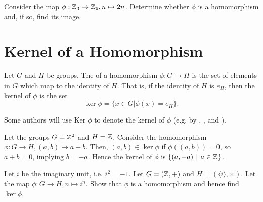 \begin{exercise}
    Consider the map $\phi: \mathbb{Z}_3 \to \mathbb{Z}_6, n \mapsto 2n$. Determine whether $\phi$ is a homomorphism and, if so, find its image.
\end{exercise}



\section{Kernel of a Homomorphism}
\begin{definition}
    Let $G$ and $H$ be groups. The  of a homomorphism $\phi: G \to H$ is the set of elements in $G$ which map to the identity of $H$. That is, if the identity of $H$ is $e_H$, then the kernel of $\phi$ is the set
    \[
        \ker\phi = \{x \in G \vert \phi(x) = e_H\}.
    \]
\end{definition}

\begin{remark}
    Some authors will use $\mathrm{Ker}\;\phi$ to denote the kernel of $\phi$ (e.g. by \cite[Definition I.2.2]{hungerford_1980}, \cite[\S 65]{clark_1984}, and \cite[p.~194]{gallian_2016}).
\end{remark}

\begin{example}
    Let the groups $G = \mathbb{Z}^2$ and $H = \mathbb{Z}$. Consider the homomorphism $\phi: G \to H, (a, b) \mapsto a+b$. Then, $(a, b) \in \ker\phi$ if $\phi((a,b)) = 0$, so $a+b = 0$, implying $ b = -a$. Hence the kernel of $\phi$ is $\{(a, -a) \vert a \in \Z\}$.
\end{example}

\begin{exercise}
    Let $i$ be the imaginary unit, i.e. $i^2 = -1$. Let $G = (\mathbb{Z}, +)$ and $H = (\langle i \rangle, \times)$. Let the map $\phi: G \to H, n \mapsto i^n$.  Show that $\phi$ is a homomorphism and hence find $\ker\phi$.
\end{exercise}


